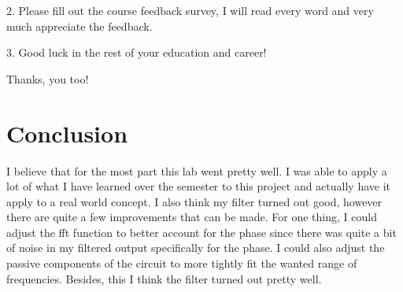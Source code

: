 \documentclass[12pt]{report}
\begin{document}
2. Please fill out the course feedback survey, I will read every word and very much appreciate
the feedback.

3. Good luck in the rest of your education and career!

Thanks, you too!

\section{Conclusion}
I believe that for the most part this lab went pretty 
well. I was able to apply a lot of what I have learned
over the semester to this project and actually have it
apply to a real world concept. I also think my filter
turned out good, however there are quite a few
improvements that can be made. For one thing, I could
adjust the fft function to better account for the phase
since there was quite a bit of noise in my filtered output
specifically for the phase. I could also adjust the
passive components of the circuit to more tightly
fit the wanted range of frequencies. Besides, this
I think the filter turned out pretty well.
\end{document}
